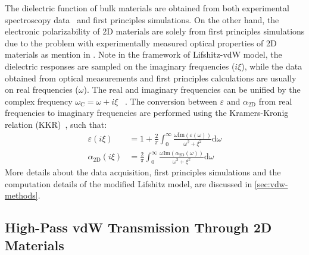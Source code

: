 The dielectric function of bulk materials are obtained from both
experimental spectroscopy data~\cite{Palik_1998_handbook} and first
principles simulations.
%
On the other hand, the electronic polarizability of 2D
materials are solely from first principles simulations due to the
problem with experimentally measured optical properties of 2D
materials as mention in .
%
Note in the framework of Lifshitz-vdW model, the dielectric responses
are sampled on the imaginary frequencies ($i\xi$), while the data
obtained from optical measurements and first principles calculations
are usually on real frequencies ($\omega$). The real and imaginary
frequencies can be unified by the complex frequency
$\omega_{\mathrm{C}} = \omega + i\xi$~\cite{parsegian_van_2010_book}
.
%
The conversion between $\varepsilon$ and $\alpha_{\mathrm{2D}}$ from
real frequencies to imaginary frequencies are performed using the
Kramers-Kronig relation (KKR)~\cite{Roessler_1965_KKR}, such that:
\begin{eqnarray}
  \label{eq:vdw-KKR-eps}
  \varepsilon(i\xi) &= 1 + {\displaystyle \frac{2}{\pi}}{\displaystyle \int_{0}^{\infty}} {\displaystyle \frac{\omega \mathrm{Im}(\varepsilon(\omega))}{\omega^{2} + \xi^{2}}} \mathrm{d}\omega \\
  \label{eq:vdw-KKR-alpha}
  \alpha_{\mathrm{2D}}(i\xi) &= {\displaystyle \frac{2}{\pi}} {\displaystyle \int_{0}^{\infty}} {\displaystyle \frac{\omega \mathrm{Im}(\alpha_{\mathrm{2D}}(\omega))}{\omega^{2} + \xi^{2}}} \mathrm{d}\omega
\end{eqnarray}
%
More details about the data acquisition, first principles simulations
and the computation details of the modified Lifshitz model, are
discussed in \autoref{sec:vdw-methods}.   


\subsection{High-Pass vdW Transmission Through 2D Materials}
\label{sec:vdw-high-pass-vdw}


